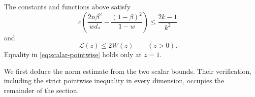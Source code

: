 \begin{lemma}\label{lem:scalar-estimates}
The constants and functions above satisfy
\begin{equation}\label{eq:scalar-mean-bound}
 c\left(\frac{2n\beta^2}{wd_*}
       -\frac{(1-\beta)^2}{1-w}\right)
 \le\frac{2k-1}{k^2}
\end{equation}
and
\begin{equation}\label{eq:scalar-pointwise}
 \mathcal L(z)\le2W(z)\qquad(z>0).
\end{equation}
Equality in \eqref{eq:scalar-pointwise} holds only at $z=1$.
\end{lemma}


We first deduce the norm estimate from the two scalar bounds. Their
verification, including the strict pointwise inequality in every
dimension, occupies the remainder of the section.

